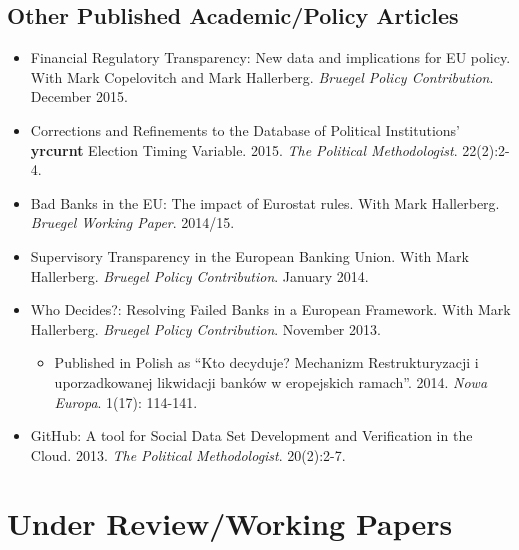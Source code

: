\documentclass[a4paper]{article}
\begin{document}
{\begin{itemize}
\end{itemize}

\subsection*{Other Published Academic/Policy Articles}

\begin{itemize}

    \item Financial Regulatory Transparency: New data and implications for EU policy. With Mark Copelovitch and Mark Hallerberg. \emph{Bruegel Policy Contribution}. December 2015.

    \item Corrections and Refinements to the Database of Political Institutions' \textbf{yrcurnt} Election Timing Variable. 2015. {\emph{The Political Methodologist}}. 22(2):2-4.

    \item Bad Banks in the EU: The impact of Eurostat rules. With Mark Hallerberg. \emph{Bruegel Working Paper}. 2014/15.

    \item Supervisory Transparency in the European Banking Union. With Mark Hallerberg. {\emph{Bruegel Policy Contribution}}. January 2014.

    \item Who Decides?: Resolving Failed Banks in a European Framework. With Mark Hallerberg. {\emph{Bruegel Policy Contribution}}. November 2013.

      \begin{itemize}
        \item Published in Polish as ``Kto decyduje? Mechanizm Restrukturyzacji i uporzadkowanej likwidacji bank\'{o}w w eropejskich ramach''. 2014. \emph{Nowa Europa}. 1(17): 114-141.
      \end{itemize}

    \item GitHub: A tool for Social Data Set Development and Verification in the Cloud. 2013. {\emph{The Political Methodologist}}. 20(2):2-7.

\end{itemize}


\section*{Under Review/Working Papers}

\begin{itemize}


\end{itemize}}
\end{document}
